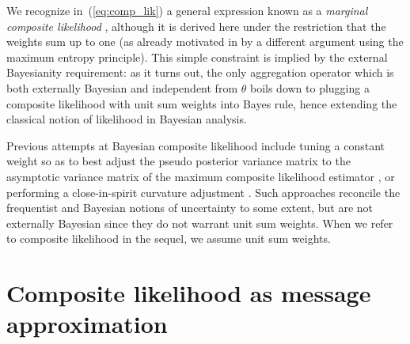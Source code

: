 \documentclass[english]{scrartcl}
\begin{document}
We recognize in~(\ref{eq:comp_lik}) a general expression known as a {\em marginal composite likelihood} \cite{Varin-11}, although it is derived here under the restriction that the weights sum up to one (as already motivated in \cite{Wang-14} by a different argument using the maximum entropy principle). 
This simple constraint is implied by the external Bayesianity requirement: as it turns out, the only aggregation operator which is both externally Bayesian and independent from $\theta$ boils down to plugging a composite likelihood with unit sum weights into Bayes rule, hence extending the classical notion of likelihood in Bayesian analysis.

Previous attempts at Bayesian composite likelihood include tuning a constant weight so as to best adjust the pseudo posterior variance matrix to the asymptotic variance matrix of the maximum composite likelihood estimator \cite{Pauli-11}, or performing a close-in-spirit curvature adjustment \cite{Ribatet-12}. Such approaches reconcile the frequentist and Bayesian notions of uncertainty to some extent, but are not externally Bayesian since they do not warrant unit sum weights. When we refer to composite likelihood in the sequel, we assume unit sum weights.



\section{Composite likelihood as message approximation}
\label{sec:message}
\end{document}
